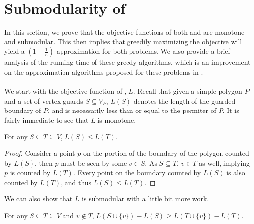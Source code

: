 \section{Submodularity of \MVVG{}}
In this section, we prove that the objective functions of both \MLVG{} and \MVVG{} are monotone and submodular. This then implies that greedily maximizing the objective will yield a $(1-\frac{1}{e})$ approximation for both problems. We also provide a brief analysis of the running time of these greedy algorithms, which is an improvement on the approximation algorithms proposed for these problems in \cite{fragoudakis-interior,fragoudakis-boundary,fragoudakis-paintings}.\\\\
We start with the objective function of \MLVG{}, $L$. Recall that given a simple polygon $P$ and a set of vertex guards $S\subseteq V_P$, $L(S)$ denotes the length of the guarded boundary of $P$, and is necessarily less than or equal to the permiter of $P$. It is fairly immediate to see that $L$ is monotone.

\begin{observation}\label{obs:monotone}
    For any $S\subseteq T\subseteq V$, $L(S)\leq L(T)$.
\end{observation}

\begin{proof}
    Consider a point $p$ on the portion of the boundary of the polygon counted by $L(S)$, then $p$ must be seen by some $v\in S$. As $S\subseteq T$, $v\in T$ as well, implying $p$ is counted by $L(T)$. Every point on the boundary counted by $L(S)$ is also counted by $L(T)$, and thus $L(S)\leq L(T)$. 
\end{proof}
\noindent
We can also show that $L$ is submodular with a little bit more work.

\begin{claim}\label{clm:submodular}
    For any $S\subseteq T\subseteq V$ and $v\notin T$, $L(S\cup\{v\})-L(S)\geq L(T\cup\{v\})-L(T)$.
\end{claim}

